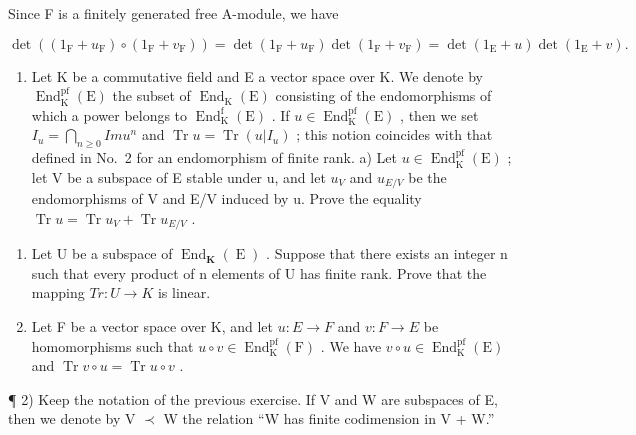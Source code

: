 Since F is a finitely generated free A-module, we have

\[
\det \left(\left(1 _ {\mathrm{F}} + u _ {\mathrm{F}}\right) \circ \left(1 _ {\mathrm{F}} + v _ {\mathrm{F}}\right)\right) = \det \left(1 _ {\mathrm{F}} + u _ {\mathrm{F}}\right) \det \left(1 _ {\mathrm{F}} + v _ {\mathrm{F}}\right) = \det \left(1 _ {\mathrm{E}} + u\right) \det \left(1 _ {\mathrm{E}} + v\right).
\]


\begin{enumerate}
\def\labelenumi{\arabic{enumi})}
\tightlist
\item
  Let K be a commutative field and E a vector space over K. We denote by \(\operatorname{End}_{\mathrm{K}}^{\mathrm{pf}}(\mathrm{E})\) the subset of \(\operatorname{End}_{\mathrm{K}}(\mathrm{E})\) consisting of the endomorphisms of which a power belongs to \(\operatorname{End}_{\mathrm{K}}^{\mathrm{f}}(\mathrm{E})\) . If \(u \in \operatorname{End}_{\mathrm{K}}^{\mathrm{pf}}(\mathrm{E})\) , then we set \(I_{u} = \bigcap_{n \geqslant 0} Im u^{n}\) and \(\operatorname{Tr} u = \operatorname{Tr}(u | I_{u})\) ; this notion coincides with that defined in No.~2 for an endomorphism of finite rank. a) Let \(u \in \operatorname{End}_{\mathrm{K}}^{\mathrm{pf}}(\mathrm{E})\) ; let V be a subspace of E stable under u, and let \(u_{V}\) and \(u_{E/V}\) be the endomorphisms of V and E/V induced by u. Prove the equality \(\operatorname{Tr} u = \operatorname{Tr} u_{V} + \operatorname{Tr} u_{E/V}\) .
\end{enumerate}

\begin{enumerate}
\def\labelenumi{\alph{enumi})}
\setcounter{enumi}{1}
\item
  Let U be a subspace of \(\operatorname{End}_{\mathbf{K}}(\operatorname{E})\) . Suppose that there exists an integer n such that every product of n elements of U has finite rank. Prove that the mapping \(Tr: U \to K\) is linear.
\item
  Let F be a vector space over K, and let \(u: E \to F\) and \(v: F \to E\) be homomorphisms such that \(u \circ v \in \operatorname{End}_{\mathrm{K}}^{\mathrm{pf}}(\mathrm{F})\) . We have \(v \circ u \in \operatorname{End}_{\mathrm{K}}^{\mathrm{pf}}(\mathrm{E})\) and \(\operatorname{Tr} v \circ u = \operatorname{Tr} u \circ v\) .
\end{enumerate}

¶ 2) Keep the notation of the previous exercise. If V and W are subspaces of E, then we denote by V \(\prec\) W the relation ``W has finite codimension in V + W.''


